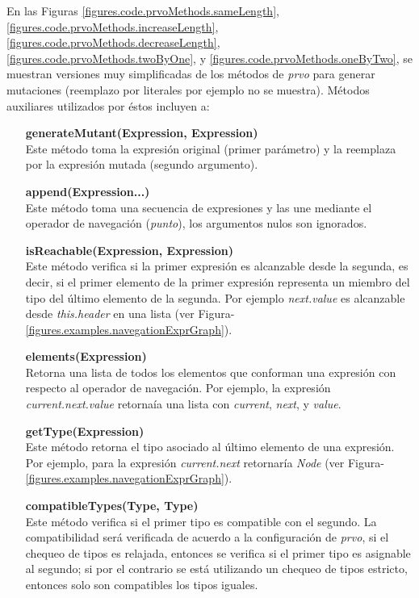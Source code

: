 En las Figuras \ref{figures.code.prvoMethods.sameLength}, \ref{figures.code.prvoMethods.increaseLength}, \ref{figures.code.prvoMethods.decreaseLength}, \ref{figures.code.prvoMethods.twoByOne}, y \ref{figures.code.prvoMethods.oneByTwo}, se muestran versiones muy simplificadas de los m\'etodos de \emph{prvo} para generar mutaciones (reemplazo por literales por ejemplo no se muestra). M\'etodos auxiliares utilizados por \'estos incluyen a:

\begin{enumerate}[leftmargin=.75cm,align=left]
	\item[\textbf{generateMutant(Expression, Expression)}]\mbox{}\\ Este m\'etodo toma la expresi\'on original (primer par\'ametro) y la reemplaza por la expresi\'on mutada (segundo argumento).
	
	\item[\textbf{append(Expression...)}]\mbox{}\\ Este m\'etodo toma una secuencia de expresiones y las une mediante el operador de navegaci\'on (\emph{punto}), los argumentos nulos son ignorados.
	
	\item[\textbf{isReachable(Expression, Expression)}]\mbox{}\\ Este m\'etodo verifica si la primer expresi\'on es alcanzable desde la segunda, es decir, si el primer elemento de la primer expresi\'on representa un miembro del tipo del \'ultimo elemento de la segunda. Por ejemplo \emph{next.value} es alcanzable desde \emph{this.header} en una lista (ver Figura-\ref{figures.examples.navegationExprGraph}).
	
	\item[\textbf{elements(Expression)}]\mbox{}\\ Retorna una lista de todos los elementos que conforman una expresi\'on con respecto al operador de navegaci\'on. Por ejemplo, la expresi\'on \emph{current.next.value} retorna\'ia una lista con \emph{current}, \emph{next}, y \emph{value}.
	
	\item[\textbf{getType(Expression)}]\mbox{}\\ Este m\'etodo retorna el tipo asociado al \'ultimo elemento de una expresi\'on. Por ejemplo, para la expresi\'on \emph{current.next} retornar\'ia \emph{Node} (ver Figura-\ref{figures.examples.navegationExprGraph}).
	
	\item[\textbf{compatibleTypes(Type, Type)}]\mbox{}\\ Este m\'etodo verifica si el primer tipo es compatible con el segundo. La compatibilidad ser\'a verificada de acuerdo a la configuraci\'on de \emph{prvo}, si el chequeo de tipos es relajada, entonces se verifica si el primer tipo es asignable al segundo; si por el contrario se est\'a utilizando un chequeo de tipos estricto, entonces solo son compatibles los tipos iguales.
	

\end{enumerate}
